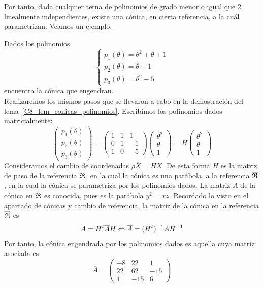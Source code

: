 Por tanto, dada cualquier terna de polinomios de grado menor o igual que 2 linealmente independientes, existe una cónica, en cierta referencia, a la cuál parametrizan. Veamos un ejemplo.
\begin{exa}
 	Dados los polinomios 
 	\[\begin{cases}
 		p_1(\theta)=\theta^2+\theta+1\\
 		p_2(\theta)=\theta-1\\
 		p_3(\theta)=\theta^2-5
 	\end{cases}\]
 	encuentra la cónica que engendran.\\
 	
 	Realizaremos los mismos pasos que se llevaron a cabo en la demostración del lema~\ref{C8_lem_conicas_polinomios}. Escribimos los polinomios dados matricialmente:
 	\begin{equation*}
 		\left( \begin{array}{c}
 			p_1(\theta)\\p_2(\theta)\\p_3(\theta)
 		\end{array}\right)=
 		\left( \begin{array}{ccc}
 			1&1&1\\
 			0&1&-1\\
 			1&0&-5
 		\end{array}\right) 
 		\left( \begin{array}{c}
 			\theta^2\\\theta\\1
 		\end{array}\right)=H
 		\left( \begin{array}{c}
 			\theta^2\\\theta\\1
 		\end{array}\right)
 	\end{equation*}
 	Consideramos el cambio de coordenadas $\rho \overline{X}=HX$. De esta forma $H$ es la matriz de paso de la referencia $\mathfrak{R}$, en la cual la cónica es una parábola, a la referencia $\overline{\mathfrak{R}}$, en la cual la cónica se parametriza por los polinomios dados. La matriz $A$ de la cónica en $\mathfrak{R}$ es conocida, pues es la parábola $y^2=xz$. Recordado lo visto en el apartado de cónicas y cambio de referencia, la matriz de la cónica en la referencia $\overline{\mathfrak{R}}$ es
 	\begin{equation}
	 	A=H^t\overline{A}H\Leftrightarrow \overline{A}=(H^t)^{-1}AH^{-1}
 	\end{equation}
 	Por tanto, la cónica engendrada por los polinomios dados es aquella cuya matriz asociada es
 	\begin{equation*}
	 	\overline{A}=\left( \begin{array}{ccc}
	 		-8&22&1\\
	 		22&62&-15\\
	 		1&-15&6
	 	\end{array}\right) 
 	\end{equation*}
\end{exa}
